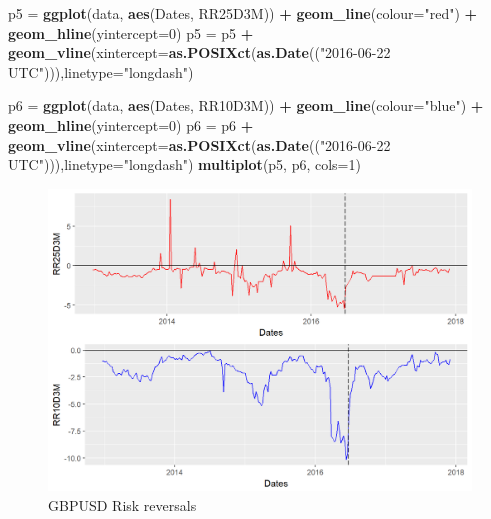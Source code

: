 \documentclass[]{book}
\newenvironment{Shaded}{\begin{snugshade}}{\end{snugshade}}
\newcommand{\KeywordTok}[1]{\textcolor[rgb]{0.13,0.29,0.53}{\textbf{#1}}}
\newcommand{\DataTypeTok}[1]{\textcolor[rgb]{0.13,0.29,0.53}{#1}}
\newcommand{\DecValTok}[1]{\textcolor[rgb]{0.00,0.00,0.81}{#1}}
\newcommand{\StringTok}[1]{\textcolor[rgb]{0.31,0.60,0.02}{#1}}
\newcommand{\OperatorTok}[1]{\textcolor[rgb]{0.81,0.36,0.00}{\textbf{#1}}}
\newcommand{\NormalTok}[1]{#1}
\theoremstyle{definition}
\theoremstyle{definition}
\theoremstyle{definition}
\theoremstyle{remark}
\begin{document}
\begin{Shaded}
\begin{Highlighting}[]
\NormalTok{p5 =}\StringTok{ }\KeywordTok{ggplot}\NormalTok{(data, }\KeywordTok{aes}\NormalTok{(Dates, RR25D3M)) }\OperatorTok{+}\StringTok{ }\KeywordTok{geom_line}\NormalTok{(}\DataTypeTok{colour=}\StringTok{"red"}\NormalTok{) }\OperatorTok{+}\StringTok{ }\KeywordTok{geom_hline}\NormalTok{(}\DataTypeTok{yintercept=}\DecValTok{0}\NormalTok{)}
\NormalTok{p5 =}\StringTok{ }\NormalTok{p5 }\OperatorTok{+}\StringTok{ }\KeywordTok{geom_vline}\NormalTok{(}\DataTypeTok{xintercept=}\KeywordTok{as.POSIXct}\NormalTok{(}\KeywordTok{as.Date}\NormalTok{((}\StringTok{"2016-06-22 UTC"}\NormalTok{))),}\DataTypeTok{linetype=}\StringTok{"longdash"}\NormalTok{)}

\NormalTok{p6 =}\StringTok{ }\KeywordTok{ggplot}\NormalTok{(data, }\KeywordTok{aes}\NormalTok{(Dates, RR10D3M)) }\OperatorTok{+}\StringTok{ }\KeywordTok{geom_line}\NormalTok{(}\DataTypeTok{colour=}\StringTok{"blue"}\NormalTok{) }\OperatorTok{+}\StringTok{ }\KeywordTok{geom_hline}\NormalTok{(}\DataTypeTok{yintercept=}\DecValTok{0}\NormalTok{)}
\NormalTok{p6 =}\StringTok{ }\NormalTok{p6 }\OperatorTok{+}\StringTok{ }\KeywordTok{geom_vline}\NormalTok{(}\DataTypeTok{xintercept=}\KeywordTok{as.POSIXct}\NormalTok{(}\KeywordTok{as.Date}\NormalTok{((}\StringTok{"2016-06-22 UTC"}\NormalTok{))),}\DataTypeTok{linetype=}\StringTok{"longdash"}\NormalTok{)}
\KeywordTok{multiplot}\NormalTok{(p5, p6, }\DataTypeTok{cols=}\DecValTok{1}\NormalTok{)}
\end{Highlighting}
\end{Shaded}

\begin{figure}
\includegraphics[width=1\linewidth]{images/unnamed-chunk-16-1} \caption{GBPUSD Risk reversals}\label{fig:unnamed-chunk-16}
\end{figure}
\end{document}

